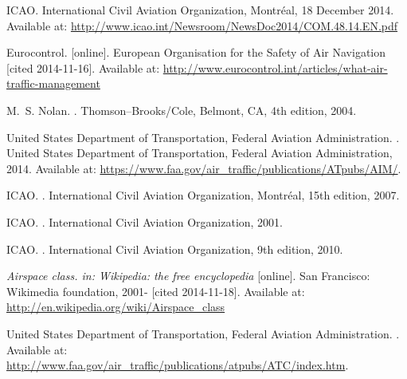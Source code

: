 \begin{thebibliography}{1}

ICAO.
\newblock International Civil Aviation Organization, Montréal, 18 December 2014.
\newblock Available at: \url{http://www.icao.int/Newsroom/NewsDoc2014/COM.48.14.EN.pdf}

Eurocontrol.
 [online].
\newblock European Organisation for the Safety of Air Navigation [cited 2014-11-16].
\newblock Available at: \url{http://www.eurocontrol.int/articles/what-air-traffic-management}

M.~S. Nolan.
.
\newblock Thomson--Brooks/Cole, Belmont, CA, 4th edition, 2004.

United States Department of Transportation, Federal Aviation Administration.
.
\newblock United States Department of Transportation, Federal Aviation Administration, 2014.
\newblock Available at: \url{https://www.faa.gov/air_traffic/publications/ATpubs/AIM/}.

ICAO.
.
\newblock International Civil Aviation Organization, Montréal, 15th edition, 2007.

ICAO.
.
\newblock International Civil Aviation Organization, 2001.

ICAO.
.
\newblock International Civil Aviation Organization, 9th edition, 2010.

{\em Airspace class. in: Wikipedia: the free encyclopedia} [online].
\newblock San Francisco: Wikimedia foundation, 2001- [cited 2014-11-18].
\newblock Available at: \url{http://en.wikipedia.org/wiki/Airspace_class}

United States Department of Transportation, Federal Aviation Administration.
.
\newblock Available at: \url{http://www.faa.gov/air_traffic/publications/atpubs/ATC/index.htm}.


\end{thebibliography}
